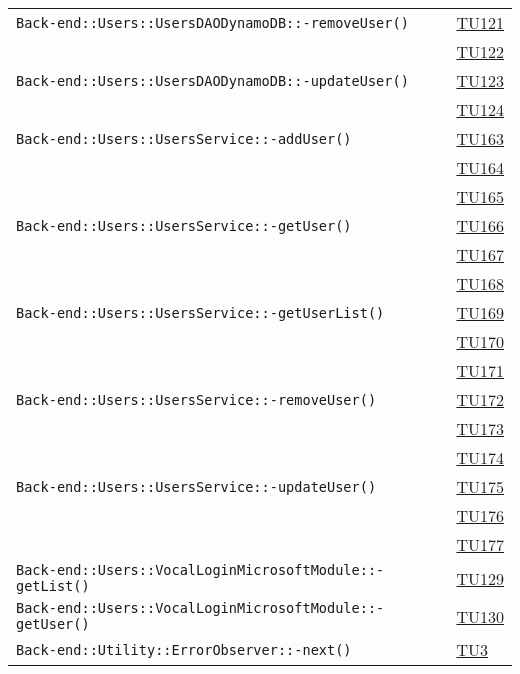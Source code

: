 \begin{longtable}{|>{\centering}m{12cm}|m{1cm}<{\centering}|}
\texttt{Back-end::Users::UsersDAODynamoDB::-\linebreak removeUser()} & \hyperlink{TU121}{TU121}\\ & \hyperlink{TU122}{TU122}\\ \hline
\texttt{Back-end::Users::UsersDAODynamoDB::-\linebreak updateUser()} & \hyperlink{TU123}{TU123}\\ & \hyperlink{TU124}{TU124}\\ \hline
\texttt{Back-end::Users::UsersService::-\linebreak addUser()} & \hyperlink{TU163}{TU163}\\ & \hyperlink{TU164}{TU164}\\ & \hyperlink{TU165}{TU165}\\ \hline
\texttt{Back-end::Users::UsersService::-\linebreak getUser()} & \hyperlink{TU166}{TU166}\\ & \hyperlink{TU167}{TU167}\\ & \hyperlink{TU168}{TU168}\\ \hline
\texttt{Back-end::Users::UsersService::-\linebreak getUserList()} & \hyperlink{TU169}{TU169}\\ & \hyperlink{TU170}{TU170}\\ & \hyperlink{TU171}{TU171}\\ \hline
\texttt{Back-end::Users::UsersService::-\linebreak removeUser()} & \hyperlink{TU172}{TU172}\\ & \hyperlink{TU173}{TU173}\\ & \hyperlink{TU174}{TU174}\\ \hline
\texttt{Back-end::Users::UsersService::-\linebreak updateUser()} & \hyperlink{TU175}{TU175}\\ & \hyperlink{TU176}{TU176}\\ & \hyperlink{TU177}{TU177}\\ \hline
\texttt{Back-end::Users::VocalLoginMicrosoftModule::-\linebreak getList()} & \hyperlink{TU129}{TU129}\\ \hline
\texttt{Back-end::Users::VocalLoginMicrosoftModule::-\linebreak getUser()} & \hyperlink{TU130}{TU130}\\ \hline
\texttt{Back-end::Utility::ErrorObserver::-\linebreak next()} & \hyperlink{TU3}{TU3}\\ \hline

\end{longtable}
